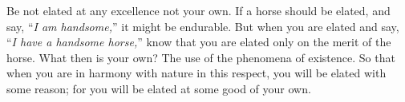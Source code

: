 Be not elated at any excellence not your own. If a horse should be
elated, and say, ``\emph{I am handsome,}'' it might be endurable. But when you are
elated and say, ``\emph{I have a handsome horse,}'' know that you are elated only
on the merit of the horse. What then is your own? The use of the
phenomena of existence. So that when you are in harmony with nature in
this respect, you will be elated with some reason; for you will be elated
at some good of your own.
